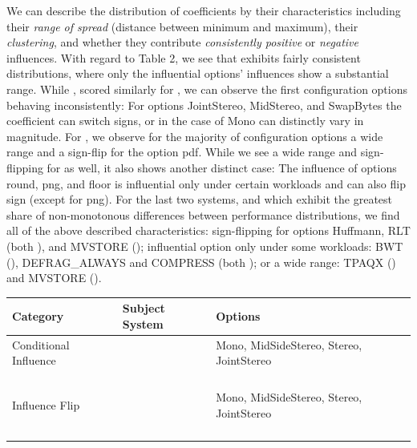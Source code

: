 {We can describe the distribution of coefficients by their characteristics including their \textit{range of spread} (distance between minimum and maximum), their \textit{clustering}, and whether they contribute \textit{consistently positive} or \textit{negative} influences. With regard to Table 2, we see that  \jadx exhibits fairly consistent distributions, where only the influential options’ influences show a substantial range. While \jumper, scored similarly for , we can observe the first configuration options behaving inconsistently: For options \textsf{JointStereo}, \textsf{MidStereo}, and \textsf{SwapBytes} the coefficient can switch signs, or in the case of \textsf{Mono} can distinctly vary in magnitude. For \batik, we observe for the majority of configuration options a wide range and a sign-flip for the option \textsf{pdf}. While we see a wide range and sign-flipping for \dconvert as well, it also  shows another distinct case: The influence of options \textsf{round}, \textsf{png}, and \textsf{floor} is influential only under certain workloads and can also flip sign (except for \textsf{png}). For the last two systems, \kanzi and \htwo which exhibit the greatest share of non-monotonous differences between performance distributions, we find all of the above described characteristics: sign-flipping for options \textsf{Huffmann}, \textsf{RLT} (both \kanzi), and \textsf{MVSTORE} (\htwo); influential option only under some workloads: \textsf{BWT} (\kanzi), \textsf{DEFRAG\_ALWAYS} and \textsf{COMPRESS} (both \htwo); or a wide range: \textsf{TPAQX} (\kanzi) and \textsf{MVSTORE} (\htwo).

\begin{table}
	\centering
	\footnotesize
	\begin{tabular}{llp{3.5cm}} %
		\toprule
		\textbf{Category} & \textbf{Subject System} & \textbf{Options} \\
		\midrule
		Conditional Influence & \jumper & \textsf{Mono, MidSideStereo, Stereo, JointStereo}\\
		\cmidrule{2-3}
		 & \kanzi & \\
		 \cmidrule{2-3}
		 & \dconvert & \\
		 \cmidrule{2-3}
		 & \htwo & \\
		 \cmidrule{2-3}
		 & \batik & \\
		\midrule
		Influence Flip & \jumper & \textsf{Mono, MidSideStereo, Stereo, JointStereo}\\
		\cmidrule{2-3}
		& \kanzi & \\
		\cmidrule{2-3}
		& \dconvert & \\
		\cmidrule{2-3}
		& \htwo & \\
		\cmidrule{2-3}
		& \batik & \\
		\bottomrule
	\end{tabular}	
\end{table}

}
